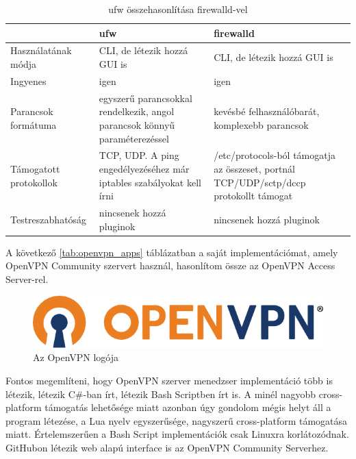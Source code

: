 	\begin{table}[h]
	\centering
	\caption{ufw összehasonlítása firewalld-vel}
	\label{tab:ufw_vs_firewalld}
	\begin{tabularx}{\linewidth}{l|X|X}
	 & ufw & firewalld \\
	\hline
	Használatának módja & CLI, de létezik hozzá GUI is & CLI, de létezik hozzá GUI is \\
	\hline
	Ingyenes & igen & igen \\
	\hline
	Parancsok formátuma & egyszerű parancsokkal rendelkezik, angol parancsok könnyű paraméterezéssel \cite{ufw} & kevésbé felhasználóbarát, komplexebb parancsok \cite{firewalld_man}\\
	\hline
	Támogatott protokollok & TCP, UDP. A ping engedélyezéséhez már iptables szabályokat kell írni & /etc/protocols-ból támogatja az összeset, portnál TCP/UDP/sctp/dccp protokollt támogat \\
	\hline
	Testreszabhatóság & nincsenek hozzá pluginok & nincsenek hozzá pluginok \\
	\end{tabularx}
	\end{table}
	
\pagebreak

A következő \ref{tab:openvpn_apps} táblázatban a saját implementációmat, amely OpenVPN Community szervert használ, hasonlítom össze az OpenVPN Access Server-rel.

\begin{figure}[h]
\centering
\includegraphics[scale=0.5]{images/openvpn-logo.png}
\caption{Az OpenVPN logója}
\end{figure}

Fontos megemlíteni, hogy OpenVPN szerver menedzser implementáció több is létezik, létezik C\#-ban írt, létezik Bash Scriptben írt is. A minél nagyobb cross-platform támogatás lehetősége miatt azonban úgy gondolom mégis helyt áll a program létezése, a Lua nyelv egyszerűsége, nagyszerű cross-platform támogatása miatt. Értelemszerűen a Bash Script implementációk csak Linuxra korlátozódnak. GitHubon létezik web alapú interface is az OpenVPN Community Serverhez.

